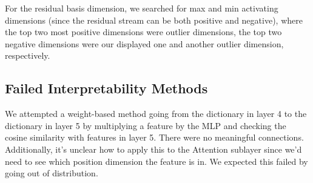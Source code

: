 For the residual basis dimension, we searched for max and min activating dimensions (since the residual stream can be both positive and negative), where the top two most positive dimensions were outlier dimensions, the top two negative dimensions were our displayed one and another outlier dimension, respectively.

\subsection{Failed Interpretability Methods}
\label{appendix:failed_interp_methods}

We attempted a weight-based method going from the dictionary in layer 4 to the dictionary in layer 5 by multiplying a feature by the MLP and checking the cosine similarity with features in layer 5. There were no meaningful connections. Additionally, it's unclear how to apply this to the Attention sublayer since we'd need to see which position dimension the feature is in. We expected this failed by going out of distribution.
